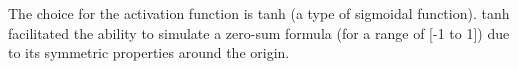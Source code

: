 \documentclass[12pt,a4paper]{article}
\begin{document}

        The choice for the activation function is tanh (a type of sigmoidal function).
        tanh facilitated the ability to simulate a zero-sum formula (for a range of [-1 to 1]) due to its symmetric properties around the origin.
        
\end{document}
